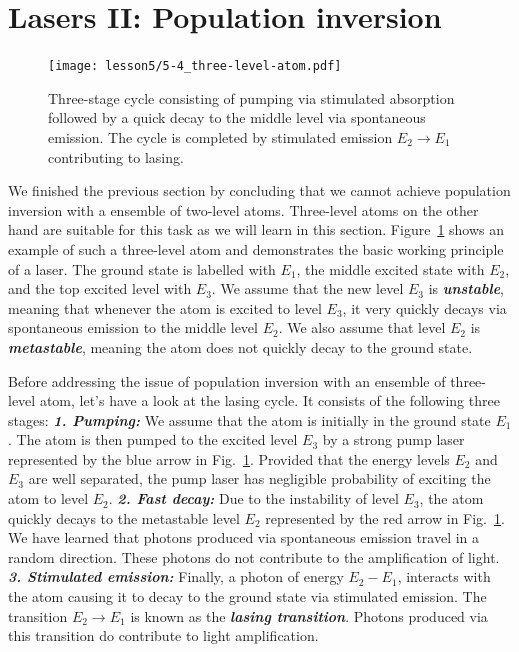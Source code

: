 \section{Lasers II: Population inversion}
\label{sec:5-4_lasers2}

\begin{figure}[t]
    \centering
    \texttt{[image: lesson5/5-4\_three-level-atom.pdf]}
    \caption[Laser cycle.]{Three-stage cycle consisting of pumping via stimulated absorption followed by a quick decay to the middle level via spontaneous emission. The cycle is completed by stimulated emission $E_2 \rightarrow E_1$ contributing to lasing.}
    \label{fig:5-4_three_level_atom}
\end{figure}

We finished the previous section by concluding that we cannot achieve population inversion with a ensemble of two-level atoms.
Three-level atoms on the other hand are suitable for this task as we will learn in this section.
Figure~\ref{fig:5-4_three_level_atom} shows an example of such a three-level atom and demonstrates the basic working principle of a laser.
The ground state is labelled with $E_1$, the middle excited state with $E_2$, and the top excited level with $E_3$.
We assume that the new level $E_3$ is \textbf{\emph{unstable}}, meaning that whenever the atom is excited to level $E_3$, it very quickly decays via spontaneous emission to the middle level $E_2$.
We also assume that level $E_2$ is \textbf{\emph{metastable}}, meaning the atom does not quickly decay to the ground state.

Before addressing the issue of population inversion with an ensemble of three-level atom, let's have a look at the lasing cycle.
It consists of the following three stages:
\newline
\textit{\textbf{1. Pumping:}}
We assume that the atom is initially in the ground state $E_1$.
The atom is then pumped to the excited level $E_3$ by a strong pump laser represented by the blue arrow in Fig.~\ref{fig:5-4_three_level_atom}.
Provided that the energy levels $E_2$ and $E_3$ are well separated, the pump laser has negligible probability of exciting the atom to level $E_2$.
\newline
\textit{\textbf{2. Fast decay:}}
Due to the instability of level $E_3$, the atom quickly decays to the metastable level $E_2$ represented by the red arrow in Fig.~\ref{fig:5-4_three_level_atom}.
We have learned that photons produced via spontaneous emission travel in a random direction.
These photons do not contribute to the amplification of light.
\newline
\textit{\textbf{3. Stimulated emission:}}
Finally, a photon of energy $E_2-E_1$, interacts with the atom causing it to decay to the ground state via stimulated emission.
The transition $E_2\rightarrow E_1$ is known as the \textbf{\emph{lasing transition}}.
Photons produced via this transition do contribute to light amplification.


